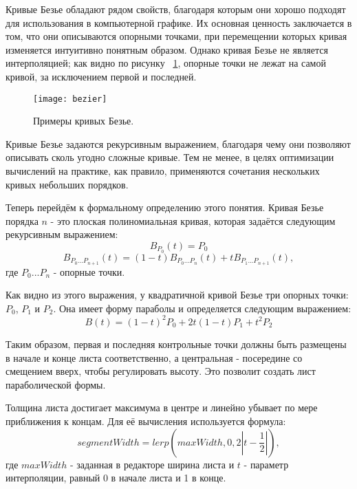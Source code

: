 Кривые Безье обладают рядом свойств, благодаря которым они хорошо подходят для использования в компьютерной графике. Их основная ценность заключается в том, что они описываются опорными точками, при перемещении которых кривая изменяется интуитивно понятным образом. Однако кривая Безье не является интерполяцией; как видно по рисунку ~\ref{fig:bezier}, опорные точки не лежат на самой кривой, за исключением первой и последней. 

\begin{figure}[!htb]
    \centering
    \texttt{[image: bezier]}
    \caption{Примеры кривых Безье.}
    \label{fig:bezier}
\end{figure}

Кривые Безье задаются рекурсивным выражением, благодаря чему они позволяют описывать сколь угодно сложные кривые. Тем не менее, в целях оптимизации вычислений на практике, как правило, применяются сочетания нескольких кривых небольших порядков. 

Теперь перейдём к формальному определению этого понятия. Кривая Безье порядка $n$ - это плоская полиномиальная кривая, которая задаётся следующим рекурсивным выражением\cite{BezierCurves}:
\begin{equation}
    B_{P_0}(t) = P_0
\end{equation}
\begin{equation*}
    B_{P_{0}...P_{n+1}}(t) = (1 - t) B_{P_{0}...P_{n}}(t) + tB_{P_{1}...P_{n+1}}(t),
\end{equation*}
где \(P_{0}...P_{n}\) - опорные точки. 

Как видно из этого выражения, у квадратичной кривой Безье три опорных точки: $P_0$, $P_1$ и $P_2$. Она имеет форму параболы и определяется следующим выражением:
\begin{equation}
    B(t) = (1 - t)^{2}P_{0} + 2t(1 - t)P_{1} + t^{2}P_{2}
\end{equation}

Таким образом, первая и последняя контрольные точки должны быть размещены в начале и конце листа соответственно, а центральная - посередине со смещением вверх, чтобы регулировать высоту. Это позволит создать лист параболической формы. 

Толщина листа достигает максимума в центре и линейно убывает по мере приближения к концам. Для её вычисления используется формула:
\begin{equation}
    segmentWidth = lerp\left(maxWidth, 0, 2\left|t - \frac{1}{2}\right|\right),
\end{equation}
где $maxWidth$ - заданная в редакторе ширина листа и $t$ - параметр интерполяции, равный 0 в начале листа и 1 в конце.

